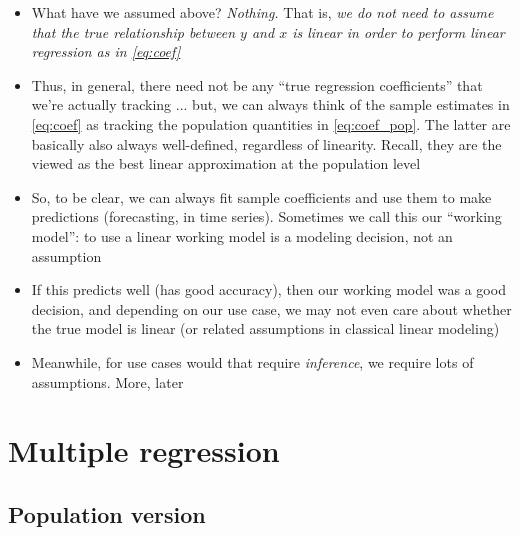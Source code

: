 \documentclass{article}
\begin{document}
\begin{itemize}
\item What have we assumed above? \emph{Nothing.} That is, \emph{we do  
    not need to assume that the true relationship between $y$ and $x$ is linear
    in order to perform linear regression as in \eqref{eq:coef}}

\item Thus, in general, there need not be any ``true regression coefficients'' 
  that we're actually tracking ... but, we can always think of the sample
  estimates  in \eqref{eq:coef} as tracking 
  the population quantities  in
  \eqref{eq:coef_pop}. The latter are basically also always well-defined, 
  regardless of linearity. Recall, they are the viewed as the best linear
  approximation at the population level 

\item So, to be clear, we can always fit sample coefficients  and use them to make predictions (forecasting, in time
  series). Sometimes we call this our ``working model'': to use a linear working
  model is a modeling decision, not an assumption  

\item If this predicts well (has good accuracy), then our working model was a
  good decision, and depending on our use case, we may not even care about
  whether the true model is linear (or related assumptions in classical linear
  modeling) 

\item Meanwhile, for use cases would that require \emph{inference}, we require
  lots of assumptions. More, later
\end{itemize}

\section{Multiple regression}

\subsection{Population version}
\end{document}
